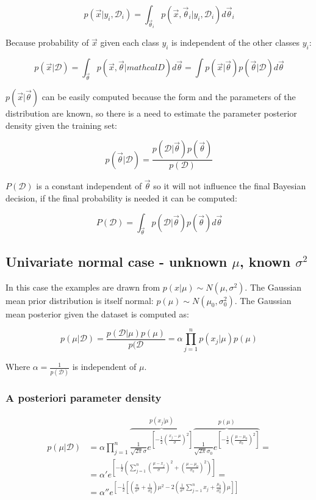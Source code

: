 	$$p(\vec{x}|y_i, \mathcal{D}_i) = \int_{\vec{\theta}_i}p(\vec{x}, \vec{\theta}_i|y_i, \mathcal{D}_i)d\vec{\theta}_i$$

	Because probability of $\vec{x}$ given each class $y_i$ is independent of the other classes $y_i$:

	$$p(\vec{x}|\mathcal{D}) = \int_{\vec{\theta}} p(\vec{x}, \vec{\theta}|mathcal{D})d\vec{\theta} =\int p(\vec{x}|\vec{\theta})p(\vec{\theta}|\mathcal{D})d\vec{\theta}$$

	$p(\vec{x}|\vec{\theta})$ can be easily computed because the form and the parameters of the distribution are known, so there is a need to estimate the parameter posterior density given the training set:

	$$p(\vec{\theta}|\mathcal{D}) = \frac{p(\mathcal{D}|\vec{\theta})p(\vec{\theta})}{p(\mathcal{D})}$$

	$P(\mathcal{D})$ is a constant independent of $\vec{\theta}$ so it will not influence the final Bayesian decision, if the final probability is needed it can be computed:

	$$P(\mathcal{D}) = \int_{\vec{\theta}}p(\mathcal{D}|\vec{\theta})p(\vec{\theta})d\vec{\theta}$$

	\subsection{Univariate normal case - unknown $\mu$, known $\sigma^2$}
	In this case the examples are drawn from $p(x|\mu)\sim N(\mu, \sigma^2)$.
	The Gaussian mean prior distribution is itself normal: $p(\mu) \sim N(\mu_0, \sigma^2_0)$.
	The Gaussian mean posterior given the dataset is computed as:

	$$p(\mu|\mathcal{D}) = \frac{p(\mathcal{D}|\mu)p(\mu)}{p(\mathcal{D}} = \alpha\prod\limits_{j=1}^np(x_j|\mu)p(\mu)$$

	Where $\alpha = \frac{1}{p(\mathcal{D})}$ is independent of $\mu$.

		\subsubsection{A posteriori parameter density}

		\begin{align*}
			p(\mu|\mathcal{D}) &= \alpha\prod\limits_{j = 1}^n\overbrace{\frac{1}{\sqrt{2\pi}\sigma}e^{[-\frac{1}{2}(\frac{x_j-\mu}{\sigma})^2]}}^{p(x_j|\mu)}\overbrace{\frac{1}{\sqrt{2\pi}\sigma_0}e^{[-\frac{1}{2}(\frac{\mu-\mu_0}{\sigma_0})^2]}}^{p(\mu)} =\\
												&=\alpha'e^{[-\frac{1}{2}(\sum\limits_{j=1}^n(\frac{\mu-x_j}{\sigma})^2+(\frac{\mu-\mu_0}{\sigma_0})^2)]} =\\
												&=\alpha''e^{[-\frac{1}{2}[(\frac{n}{\sigma^2}+\frac{1}{\sigma^2_0})\mu^2 - 2(\frac{1}{\sigma^2}\sum\limits_{j=1}^nx_j + \frac{\mu_0}{\sigma^2_0})\mu]]}
		\end{align*}

